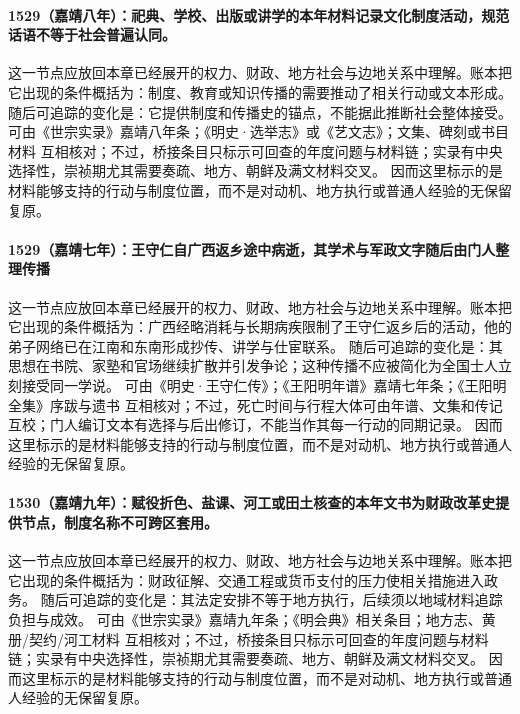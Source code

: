 \paragraph{1529（嘉靖八年）：祀典、学校、出版或讲学的本年材料记录文化制度活动，规范话语不等于社会普遍认同。} 这一节点应放回本章已经展开的权力、财政、地方社会与边地关系中理解。账本把它出现的条件概括为：制度、教育或知识传播的需要推动了相关行动或文本形成。 随后可追踪的变化是：它提供制度和传播史的锚点，不能据此推断社会整体接受。 可由《世宗实录》嘉靖八年条；《明史·选举志》或《艺文志》；文集、碑刻或书目材料 互相核对；不过，桥接条目只标示可回查的年度问题与材料链；实录有中央选择性，崇祯期尤其需要奏疏、地方、朝鲜及满文材料交叉。 因而这里标示的是材料能够支持的行动与制度位置，而不是对动机、地方执行或普通人经验的无保留复原。

\paragraph{1529（嘉靖七年）：王守仁自广西返乡途中病逝，其学术与军政文字随后由门人整理传播} 这一节点应放回本章已经展开的权力、财政、地方社会与边地关系中理解。账本把它出现的条件概括为：广西经略消耗与长期病疾限制了王守仁返乡后的活动，他的弟子网络已在江南和东南形成抄传、讲学与仕宦联系。 随后可追踪的变化是：其思想在书院、家塾和官场继续扩散并引发争论；这种传播不应被简化为全国士人立刻接受同一学说。 可由《明史·王守仁传》；《王阳明年谱》嘉靖七年条；《王阳明全集》序跋与遗书 互相核对；不过，死亡时间与行程大体可由年谱、文集和传记互校；门人编订文本有选择与后出修订，不能当作其每一行动的同期记录。 因而这里标示的是材料能够支持的行动与制度位置，而不是对动机、地方执行或普通人经验的无保留复原。

\paragraph{1530（嘉靖九年）：赋役折色、盐课、河工或田土核查的本年文书为财政改革史提供节点，制度名称不可跨区套用。} 这一节点应放回本章已经展开的权力、财政、地方社会与边地关系中理解。账本把它出现的条件概括为：财政征解、交通工程或货币支付的压力使相关措施进入政务。 随后可追踪的变化是：其法定安排不等于地方执行，后续须以地域材料追踪负担与成效。 可由《世宗实录》嘉靖九年条；《明会典》相关条目；地方志、黄册/契约/河工材料 互相核对；不过，桥接条目只标示可回查的年度问题与材料链；实录有中央选择性，崇祯期尤其需要奏疏、地方、朝鲜及满文材料交叉。 因而这里标示的是材料能够支持的行动与制度位置，而不是对动机、地方执行或普通人经验的无保留复原。

